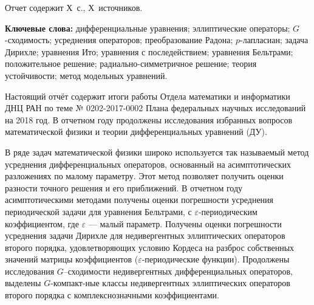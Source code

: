 \Referat %

Отчет содержит Х~с., Х~источников.%

\bigskip
\textbf{ Ключевые
	слова:}
дифференциальные уравнения;
эллиптические операторы;
$G$-\linebreak сходимость; %
усреднения операторов;
преобразование Радона;
$p$-лапласиан;
задача Дирихле;
уравнения Ито;
уравнения с последействием;
уравнения Бельтрами;
положительное решение;
радиально-симметричное решение;
теория устойчивости;
метод модельных уравнений.


\bigskip



Настоящий отчёт содержит итоги работы Отдела математики и информатики ДНЦ РАН по теме № 0202-2017-0002  Плана федеральных научных исследований на 2018 год.
В отчетном году продолжены исследования избранных вопросов математической физики и теории дифференциальных уравнений (ДУ).

В ряде задач математической физики широко используется так называемый метод усреднения дифференциальных операторов, основанный на асимптотических разложениях по малому параметру. Этот метод позволяет получить оценки разности точного решения и его приближений.
В отчетном году асимптотическими методами получены оценки погрешности усреднения периодической задачи для уравнения Бельтрами, с $\varepsilon$-периодическим коэффициентом, где $\varepsilon$  --- малый параметр.
Получены оценки погрешности усреднения задачи Дирихле для недивергентных эллиптических операторов второго порядка, удовлетворяющих условию Кордеса на разброс собственных значений матрицы коэффициентов ($\varepsilon$-периодические функции).
Продолжены исследования  $G$--сходимости недивергентных дифференциальных операторов, выделены $G$-компакт-\linebreak ные классы недивергентных эллиптических операторов второго порядка с комплекснозначными коэффициентами.








